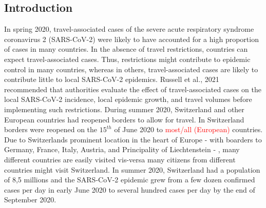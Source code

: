 \documentclass[10pt, a4paper, twoside]{article}
\begin{document}
\begin{multicols}{2}
\section{Introduction}
In spring 2020, travel-associated cases of the severe acute respiratory syndrome coronavirus 2 (SARS-CoV-2) were likely to have accounted for a high proportion of cases in many countries.\cite{russell_effect_2021} In the absence of travel restrictions, countries can expect travel-associated cases.\cite{russell_effect_2021} Thus, restrictions might contribute to epidemic control in many countries, whereas in others, travel-associated cases are likely to contribute little to local SARS-CoV-2 epidemics.\cite{russell_effect_2021}  Russell et al., 2021 recommended that authorities evaluate the effect of travel-associated cases on the local SARS-CoV-2 incidence, local epidemic growth, and travel volumes before implementing such restrictions.\cite{russell_effect_2021} During summer 2020, Switzerland and other European countries had reopened borders to allow for travel. In Switzerland borders were reopened on the $15^{th}$ of June 2020 to \textcolor{red}{most/all (European)} countries. Due to Switzerlands prominent location in the heart of Europe - with boarders to Germany, France, Italy, Austria, and Principality of Liechtenstein - , many different countries are easily visited vis-versa many citizens from different countries might visit Switzerland. In summer 2020, Switzerland had a population of 8,5 millions and the SARS-CoV-2 epidemic grew from a few dozen confirmed cases per day in early June 2020 to several hundred cases per day by the end of September 2020. 


\end{multicols}
\end{document}

